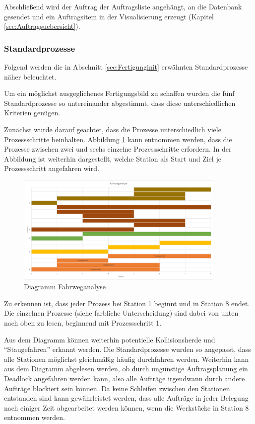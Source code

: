Abschließend wird der Auftrag der Auftragsliste angehängt, an die Datenbank gesendet und ein Auftragsitem in der Visualisierung erzeugt (Kapitel \ref{sec:Auftragsuebersicht}). 

\subsubsection{Standardprozesse}
\label{sec:Standardprozesse}

Folgend werden die in Abschnitt \ref{sec:Fertigunginit} erwähnten Standardprozesse näher beleuchtet. 

Um ein möglichst ausgeglichenes Fertigungsbild zu schaffen wurden die fünf Standardprozesse so untereinander abgestimmt, dass diese unterschiedlichen Kriterien genügen. 

Zunächst wurde darauf geachtet, dass die Prozesse unterschiedlich viele Prozessschritte beinhalten. Abbildung \ref{fig:Fahrweganalyse} kann entnommen werden, dass die Prozesse zwischen zwei und sechs einzelne Prozessschritte erfordern. In der Abbildung ist weiterhin dargestellt, welche Station als Start und Ziel je Prozessschritt angefahren wird. 

\begin{figure}[htb]
    \centering
    \includegraphics[width=0.9\textwidth]{Abbildungen/Fahrweganalyse.PNG}
    \caption{Diagramm Fahrweganalyse}		
    \label{fig:Fahrweganalyse}
\end{figure}

Zu erkennen ist, dass jeder Prozess bei Station 1 beginnt und in Station 8 endet. Die einzelnen Prozesse (siehe farbliche Unterscheidung) sind dabei von unten nach oben zu lesen, beginnend mit Prozessschritt 1. 

Aus dem Diagramm können weiterhin potentielle Kollisionsherde und "`Staugefahren"' erkannt werden. Die Standardprozesse wurden so angepasst, dass alle Stationen möglichst gleichmäßig häufig durchfahren werden. Weiterhin kann aus dem Diagramm abgelesen werden, ob durch ungünstige Auftragsplanung ein Deadlock angefahren werden kann, also alle Aufträge irgendwann durch andere Aufträge blockiert sein können. Da keine Schleifen zwischen den Stationen entstanden sind kann gewährleistet werden, dass alle Aufträge in jeder Belegung nach einiger Zeit abgearbeitet werden können, wenn die Werkstücke in Station 8 entnommen werden.

